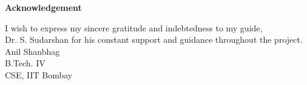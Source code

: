 \begin{center}
{\large \bfseries
Acknowledgement
}~\\[1cm]
\end{center}
\begin{flushleft}
{
I wish to express my sincere gratitude and indebtedness to my guide, \\ Dr. S. Sudarshan for his constant support and guidance	 throughout the project. 
}~\\[1.5cm]
{
Anil Shanbhag\\
B.Tech. IV\\
CSE, IIT Bombay
}
\end{flushleft}
